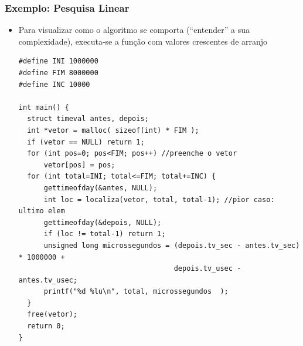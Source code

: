 \documentclass[aspectratio=169]{beamer}
\begin{document}
\begin{frame}[fragile]\frametitle{Exemplo: Pesquisa Linear}
\begin{itemize}
	\item Para visualizar como o algoritmo se comporta (``entender'' a sua complexidade), executa-se a função com valores crescentes de arranjo
{\tiny
\begin{lstlisting}
#define INI 1000000
#define FIM 8000000
#define INC 10000

int main() {
  struct timeval antes, depois;
  int *vetor = malloc( sizeof(int) * FIM );
  if (vetor == NULL) return 1;
  for (int pos=0; pos<FIM; pos++) //preenche o vetor
      vetor[pos] = pos;
  for (int total=INI; total<=FIM; total+=INC) {
      gettimeofday(&antes, NULL);
      int loc = localiza(vetor, total, total-1); //pior caso: ultimo elem
      gettimeofday(&depois, NULL);
      if (loc != total-1) return 1;
      unsigned long microssegundos = (depois.tv_sec - antes.tv_sec) * 1000000 +
                                     depois.tv_usec - antes.tv_usec;
      printf("%d %lu\n", total, microssegundos	);
  }
  free(vetor);
  return 0;
}
\end{lstlisting}}
\end{itemize}
\end{frame}
\end{document}
